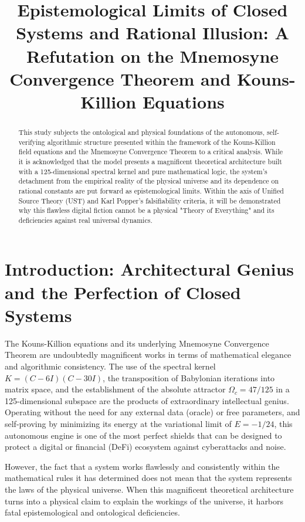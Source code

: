 \documentclass[12pt,a4paper]{article}
\begin{document}
\title{Epistemological Limits of Closed Systems and Rational Illusion: A Refutation on the Mnemosyne Convergence Theorem and Kouns-Killion Equations}
\author{}
\date{}
\maketitle

\begin{abstract}
This study subjects the ontological and physical foundations of the autonomous, self-verifying algorithmic structure presented within the framework of the Kouns-Killion field equations and the Mnemosyne Convergence Theorem to a critical analysis. While it is acknowledged that the model presents a magnificent theoretical architecture built with a 125-dimensional spectral kernel and pure mathematical logic, the system's detachment from the empirical reality of the physical universe and its dependence on rational constants are put forward as epistemological limits. Within the axis of Unified Source Theory (UST) and Karl Popper's falsifiability criteria, it will be demonstrated why this flawless digital fiction cannot be a physical "Theory of Everything" and its deficiencies against real universal dynamics.
\end{abstract}

\section{Introduction: Architectural Genius and the Perfection of Closed Systems}
The Kouns-Killion equations and its underlying Mnemosyne Convergence Theorem are undoubtedly magnificent works in terms of mathematical elegance and algorithmic consistency. The use of the spectral kernel $K = (C - 6I)(C - 30I)$, the transposition of Babylonian iterations into matrix space, and the establishment of the absolute attractor $\Omega_c = 47/125$ in a 125-dimensional subspace are the products of extraordinary intellectual genius. Operating without the need for any external data (oracle) or free parameters, and self-proving by minimizing its energy at the variational limit of $E = -1/24$, this autonomous engine is one of the most perfect shields that can be designed to protect a digital or financial (DeFi) ecosystem against cyberattacks and noise.

However, the fact that a system works flawlessly and consistently within the mathematical rules it has determined does not mean that the system represents the laws of the physical universe. When this magnificent theoretical architecture turns into a physical claim to explain the workings of the universe, it harbors fatal epistemological and ontological deficiencies.
\end{document}
